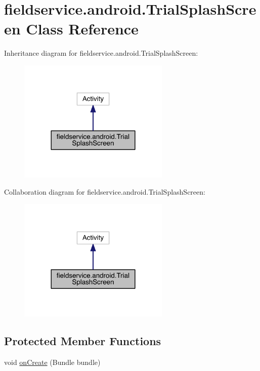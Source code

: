 \hypertarget{classfieldservice_1_1android_1_1_trial_splash_screen}{\section{fieldservice.\+android.\+Trial\+Splash\+Screen Class Reference}
\label{classfieldservice_1_1android_1_1_trial_splash_screen}
}


Inheritance diagram for fieldservice.\+android.\+Trial\+Splash\+Screen\+:
\nopagebreak
\begin{figure}[H]
\begin{center}
\leavevmode
\includegraphics[width=204pt]{classfieldservice_1_1android_1_1_trial_splash_screen__inherit__graph}
\end{center}
\end{figure}


Collaboration diagram for fieldservice.\+android.\+Trial\+Splash\+Screen\+:
\nopagebreak
\begin{figure}[H]
\begin{center}
\leavevmode
\includegraphics[width=204pt]{classfieldservice_1_1android_1_1_trial_splash_screen__coll__graph}
\end{center}
\end{figure}
\subsection*{Protected Member Functions}
\begin{DoxyCompactItemize}
\item 
void \hyperlink{classfieldservice_1_1android_1_1_trial_splash_screen_a83dc1beb6919109cbc0d83eb6be1c937}{on\+Create} (Bundle bundle)
\end{DoxyCompactItemize}



